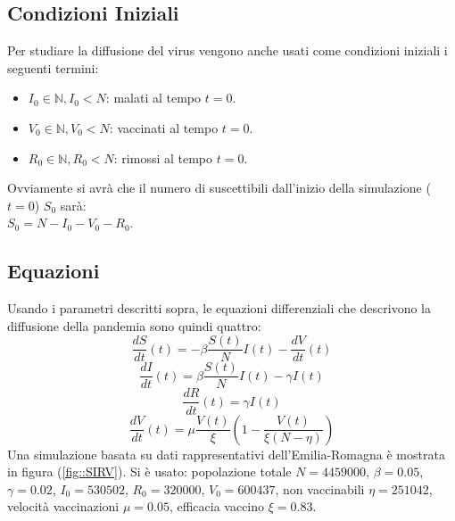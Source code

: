 \documentclass{article}
\begin{document}
\subsection{Condizioni Iniziali}
Per studiare la diffusione del virus vengono anche usati come 
condizioni iniziali i seguenti termini:
\begin{itemize}
\item $I_0 \in \mathbb{N}, I_0 < N$: malati al tempo $t = 0$.
\item $V_0 \in \mathbb{N}, V_0 < N $: vaccinati al tempo $t = 0$.
\item $R_0 \in \mathbb{N}, R_0 < N $: rimossi al tempo $t = 0$.
\end{itemize}
Ovviamente si avrà che il numero di suscettibili dall'inizio della 
simulazione ($t = 0$) $S_0$ sarà: \\
$S_0 = N - I_0 - V_0 - R_0$.\\
\subsection{Equazioni}
Usando i parametri descritti sopra, le equazioni differenziali che 
descrivono la diffusione della pandemia sono quindi quattro:\\
\begin{equation} \label{eq::S}
\frac{dS}{dt}(t)= -\beta \frac{S(t)}{N}I(t) - \frac{dV}{dt}(t)
\end{equation}
\begin{equation}\label{eq::I}
\frac{dI}{dt}(t)= \beta \frac{S(t)}{N}I(t) - \gamma I(t)
\end{equation}
\begin{equation}\label{eq::R}
\frac{dR}{dt}(t)= \gamma I(t)
\end{equation}
\begin{equation}\label{eq::V}
\frac{dV}{dt}(t)= \mu\frac{V(t)}{\xi}\left( 1-\frac{V(t)}{\xi(N-\eta)}\right)
\end{equation}
Una simulazione basata su dati rappresentativi dell'Emilia-Romagna
 è mostrata in figura (\ref{fig::SIRV}). 
 Si è usato: popolazione totale $N=4459000$, $\beta=0.05$, 
 $\gamma=0.02$, $I_0 = 530502$, $R_0 = 320000$, $V_0 = 600437$,
 non vaccinabili $\eta = 251042$, 
 velocità vaccinazioni $\mu = 0.05$, efficacia 
 vaccino $\xi= 0.83$.
\end{document}
